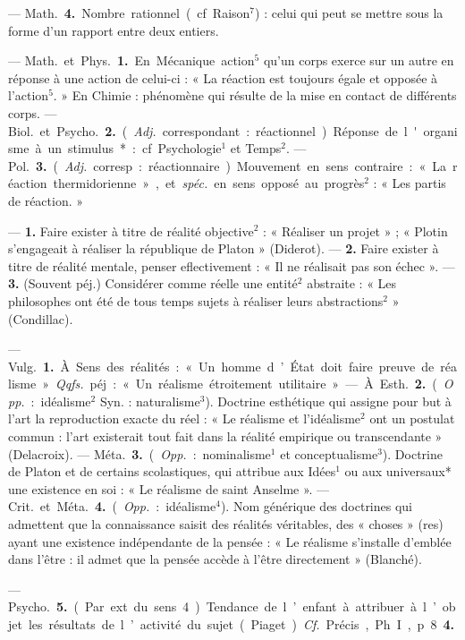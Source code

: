 \begin{itemize}[leftmargin=1cm, label=, itemsep=1pt]
— \si{Math.} {\bf 4.} Nombre rationnel (cf.
Raison$^7$) : celui qui peut se mettre
sous la forme d’un rapport entre
deux entiers.

 — \si{Math.} et \si{Phys.} {\bf 1.} En
Mécanique action$^5$ qu’un corps
exerce sur un autre en réponse à
une action de celui-ci : « La réaction
est toujours égale et opposée à
l'action$^5$. » En Chimie : phénomène
qui résulte de la mise en contact de
différents corps. — \si{Biol.} et \si{Psycho.}
 {\bf 2.} ({\it Adj.} correspondant : réactionnel).
Réponse de l'organisme à un stimulus* : cf. Psychologie$^1$ et Temps$^2$.
— \si{Pol.} {\bf 3.} ({\it Adj.} corresp. : réactionnaire). Mouvement en sens contraire : « La réaction thermidorienne », et {\it spéc.} en sens opposé au
progrès$^2$ : « Les partis de réaction. »

 — {\bf 1.} Faire exister à titre de
réalité objective$^2$ : « Réaliser un
projet » ; « Plotin s'engageait à réaliser la république de Platon » (Diderot). — {\bf 2.} Faire exister à titre de
réalité mentale, penser eflectivement : « Il ne réalisait pas son
échec ». — {\bf 3.} (Souvent péj.) Considérer comme réelle une entité$^2$ abstraite : « Les philosophes ont été
de tous temps sujets à réaliser leurs
abstractions$^2$ » (Condillac).

 — \si{Vulg.} {\bf 1.} À. Sens des réalités : « Un homme d’État doit faire
preuve de réalisme. » {\it Qqfs.} péj. :
« Un réalisme étroitement utilitaire. »

— À. \si{Esth.} {\bf 2.} ({\it Opp.} : idéalisme$^2$
Syn. : naturalisme$^3$). Doctrine esthétique qui assigne pour but à l’art
la reproduction exacte du réel : « Le
réalisme et l’idéalisme$^2$ ont un postulat
commun : l'art existerait tout
fait dans la réalité empirique ou
transcendante » (Delacroix). —
\si{Méta.} {\bf 3.} ({\it Opp.} : nominalisme$^1$ et
conceptualisme$^3$). Doctrine de Platon
et de certains scolastiques, qui
attribue aux Idées$^1$ ou aux universaux* une existence en soi : « Le
réalisme de saint Anselme ». —
\si{Crit.} et \si{Méta.} {\bf 4.} ({\it Opp.} : idéalisme$^4$).
Nom générique des doctrines qui
admettent que la connaissance saisit
des réalités véritables, des « choses »
(res) ayant une existence indépendante de la pensée : « Le réalisme
s’installe d'emblée dans l'être : il
admet que la pensée accède à l'être
directement » (Blanché).

— \si{Psycho.} {\bf 5.} (Par ext. du sens 4).
Tendance de l’enfant à attribuer à
l’objet les résultats de l’activité du
sujet (Piaget). {\it Cf.} Précis, Ph. I,
p. 8 {\bf 4.}


\end{itemize}
